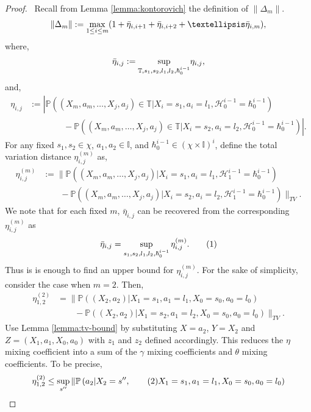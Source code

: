 \documentclass[10pt,a4paper]{amsart}
\newcommand{\History}{\mathcal{H}}
\newcommand{\Ibb}{\mathbb{I}}
\newcommand{\Pbb}{\mathbb{P}}
\newcommand{\deltam}{\lVert \Delta_m \rVert}
\newcommand{\history}{\hbar}
\newcommand{\lp}{\left(}
\newcommand\numberthis{\addtocounter{equation}{1}\tag{\theequation}}
\newcommand{\pow}[1]{^{(#1)}}
\newcommand{\prob}{\Pbb}
\newcommand{\probl}{\prob}
\newcommand{\rp}{\right)}
\begin{document}
\begin{proof} \
Recall from Lemma \ref{lemma:kontorovich} the definition of $\deltam$.
\[
\|\Delta_m\|:=\underset{1\leq i\leq m}{\max} (1+ \Bar{\eta}_{i,i+1}+ \Bar{\eta}_{i,i+2}+\dots \Bar{\eta}_{i,m}),
\]
where, 
\begin{align*}
    \Bar{\eta}_{i,j}:= \underset{\mathbb{T},s_1,s_2,l_1,l_2,\history_0^{i-1}}{\sup} \eta_{i,j},
\end{align*}
and, 
\begin{align*}
    \eta_{i,j} & := \left|\prob\left((X_m,a_m,\dots, X_j,a_j)\in \mathbb{T}|X_i=s_1,a_i=l_1,\History_0^{i-1}=\history_0^{i-1}\right)\right.\\
    & \left.\qquad \qquad -\prob\left((X_m,a_m,\dots,X_j,a_j)\in\mathbb{T}|X_i=s_2,a_i=l_2,\History_0^{i-1}=\history_0^{i-1}\right)\right|.
\end{align*}
For any fixed $s_1,s_2\in \chi$, $a_1,a_2\in\Ibb$, and $\history_0^{i-1}\in (\chi\times\Ibb)^{i}$, define the total variation distance $\eta_{i,j}\pow{m}$ as, 
\begin{align*}
\eta_{i,j}\pow{m} & := \|\probl\left((X_m,a_m,\dots, X_j,a_j)|X_i=s_1,a_i=l_1,\History_1^{i-1}=\history_0^{i-1}\right)\\
    &  \qquad -\probl\left((X_m,a_m,\dots,X_j,a_j)|X_i=s_2,a_i=l_2,\History_1^{i-1}=\history_0^{i-1}\right)\|_{TV}.
\end{align*}
We note that for each fixed $m$, $\bar \eta_{i,j}$ can be recovered from the corresponding $\eta_{i,j}\pow{m}$ as 
\begin{align*}
    \bar \eta_{i,j} = \sup_{s_1,s_2,l_1,l_2,\history_0^{i-1}} \eta_{i,j}\pow{m}. \numberthis\label{eq:db-eq4}
\end{align*}
Thus is is enough to find an upper bound for $\eta_{i,j}\pow{m}$. 
For the sake of simplicity, consider the case when $m=2$. Then, 
\begin{align*}
    \eta_{1,2}\pow{2} & =\bigg\|\probl\lp(X_2,a_2)|X_1=s_1,a_1=l_1,X_0=s_0,a_0=l_0\rp\\
    & \qquad -\probl\lp(X_2,a_2)|X_1=s_2,a_1=l_2,X_0=s_0,a_0=l_0\rp\bigg\|_{TV}.
\end{align*}
Use Lemma \ref{lemma:tv-bound} by substituting $X=a_2$, $Y=X_2$ and $Z=(X_1,a_1,X_0,a_0)$ with $z_1$ and $z_2$ defined accordingly.
This reduces the $\eta$ mixing coefficient into a sum of the $\gamma$ mixing coefficients and $\theta$ mixing coefficients. 
To be precise, 
\begin{align*}
    \eta_{1,2}\pow{2}& \leq \sup_{s''}\| \probl\lp a_2|X_2=s'',\numberthis\label{eq:db-eq1} X_1=s_1,a_1=l_1,X_0=s_0,a_0=l_0\rp\\

\end{align*}
\end{proof}
\end{document}

